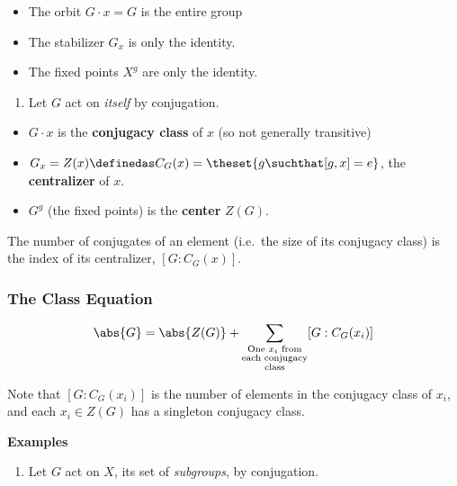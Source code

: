 \begin{itemize}
\item
  The orbit \(G\cdot x = G\) is the entire group
\item
  The stabilizer \(G_x\) is only the identity.
\item
  The fixed points \(X^g\) are only the identity.
\end{itemize}

\begin{enumerate}
\def\labelenumi{\arabic{enumi}.}
\setcounter{enumi}{1}
\tightlist
\item
  Let \(G\) act on \emph{itself} by conjugation.
\end{enumerate}

\begin{itemize}
\item
  \(G \cdot x\) is the \textbf{conjugacy class} of \(x\) (so not
  generally transitive)
\item
  \(G_x = Z(x) \definedas C_G(x) = \theset{g \suchthat [g, x] = e}\),
  the \textbf{centralizer} of \(x\).
\item
  \(G^g\) (the fixed points) is the \textbf{center} \(Z(G)\).
\end{itemize}

\begin{corollary}

The number of conjugates of an element (i.e.~the size of its conjugacy
class) is the index of its centralizer, \([G: C_G(x)]\).

\end{corollary}

\hypertarget{the-class-equation}{%
\subsubsection{The Class Equation}\label{the-class-equation}}

\begin{align*}
\abs{G} = \abs{Z(G)} + \sum_{\substack{\text{One $x_i$ from} \\ \text{each conjugacy} \\ \text{class}}} [G: C_G(x_i)]
\end{align*}

Note that \([G: C_G(x_i)]\) is the number of elements in the conjugacy
class of \(x_i\), and each \(x_i \in Z(G)\) has a singleton conjugacy
class.

\textbf{Examples}

\begin{enumerate}
\def\labelenumi{\arabic{enumi}.}
\tightlist
\item
  Let \(G\) act on \(X\), its set of \emph{subgroups}, by conjugation.
\end{enumerate}

